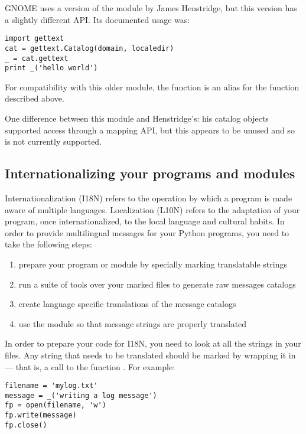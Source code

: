 GNOME uses a version of the  module by
James Henstridge, but this version has a slightly different API.  Its
documented usage was:

\begin{verbatim}
import gettext
cat = gettext.Catalog(domain, localedir)
_ = cat.gettext
print _('hello world')
\end{verbatim}

For compatibility with this older module, the function
 is an alias for the 
function described above.

One difference between this module and Henstridge's: his catalog
objects supported access through a mapping API, but this appears to be
unused and so is not currently supported.

\subsection{Internationalizing your programs and modules}
Internationalization (I18N) refers to the operation by which a program
is made aware of multiple languages.  Localization (L10N) refers to
the adaptation of your program, once internationalized, to the local
language and cultural habits.  In order to provide multilingual
messages for your Python programs, you need to take the following
steps:

\begin{enumerate}
    \item prepare your program or module by specially marking
          translatable strings
    \item run a suite of tools over your marked files to generate raw
          messages catalogs
    \item create language specific translations of the message catalogs
    \item use the  module so that message strings are
          properly translated
\end{enumerate}

In order to prepare your code for I18N, you need to look at all the
strings in your files.  Any string that needs to be translated
should be marked by wrapping it in  --- that is, a call
to the function \function{_()}.  For example:

\begin{verbatim}
filename = 'mylog.txt'
message = _('writing a log message')
fp = open(filename, 'w')
fp.write(message)
fp.close()
\end{verbatim}

